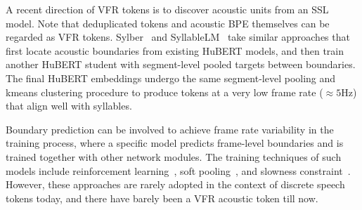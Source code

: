 A recent direction of VFR tokens is to discover acoustic units from an SSL model.
Note that deduplicated tokens and acoustic BPE themselves can be regarded as VFR tokens.
Sylber~\cite{cho2024sylber} and SyllableLM~\cite{baade2024syllablelm} take similar approaches that first locate acoustic boundaries from existing HuBERT models, and then train another HuBERT student with segment-level pooled targets between boundaries.
The final HuBERT embeddings undergo the same segment-level pooling and kmeans clustering procedure to produce tokens at a very low frame rate ($\approx5$Hz) that align well with syllables.

Boundary prediction can be involved to achieve frame rate variability in the training process, where a specific model predicts frame-level boundaries and is trained together with other network modules.
The training techniques of such models include reinforcement learning~\cite{cuervo2022variable}, soft pooling~\cite{hwang2024removing}, and slowness constraint~\cite{dieleman2021variable}.
However, these approaches are rarely adopted in the context of discrete speech tokens today, and there have barely been a VFR acoustic token till now.
